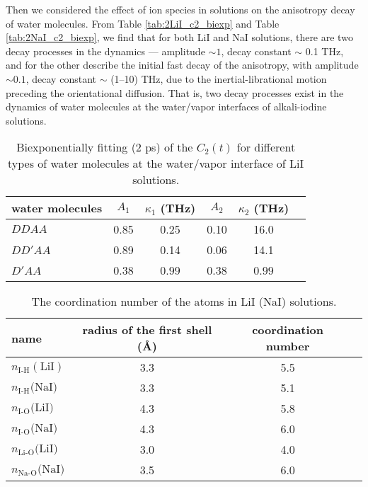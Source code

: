Then we considered the effect of ion species in solutions on the anisotropy decay of water molecules.
From Table \ref{tab:2LiI_c2_biexp} and Table \ref{tab:2NaI_c2_biexp}, we find that 
for both LiI and NaI solutions, there are two decay processes in the dynamics --- amplitude $\sim 1$,
decay constant $\sim$ 0.1 THz, and for the other describe the initial fast decay 
of the anisotropy, with amplitude $\sim 0.1$, decay constant $\sim$ (1--10) THz, 
due to the inertial-librational motion preceding the orientational diffusion.
That is, two decay processes exist in the dynamics of water molecules 
at the water/vapor interfaces of alkali-iodine solutions. 
%
\begin{table}[H]
\centering
\caption{\label{tab:fitting_c2_for_each_type_of_water}%
  Biexponentially fitting (2 ps) of the $C_2(t)$ for different types of water molecules at the water/vapor interface of LiI solutions.}
\begin{tabular}{lccccc}
water molecules & $A_1$  & $\kappa_1$ (THz) & $A_2$ & $\kappa_2$ (THz) \\
\hline
$DDAA$ & 0.85 & 0.25   & 0.10 & 16.0\\
$DD'AA$ & 0.89 & 0.14  & 0.06 & 14.1 \\
$D'AA$ & 0.38 & 0.99 & 0.38 & 0.99 \\
\end{tabular}
\end{table}
%
\begin{table}[H] %
\centering
\caption{\label{tab:table_CoordNo}%
The coordination number of the atoms in LiI (NaI) solutions.}
\begin{tabular}{lccc}
name & radius of the first shell (\AA) & coordination number \\
\hline
$n_\text{I-H}(\text{LiI})$ & 3.3 & 5.5 \\
$n_\text{I-H}(\text{NaI)}$ & 3.3 & 5.1 \\
$n_\text{I-O}(\text{LiI)}$ & 4.3 & 5.8 \\
$n_\text{I-O}(\text{NaI)}$ & 4.3 & 6.0 \\
$n_\text{Li-O}(\text{LiI)}$ & 3.0 & 4.0 \\
$n_\text{Na-O}(\text{NaI)}$ & 3.5 & 6.0 
\end{tabular}
\end{table}

